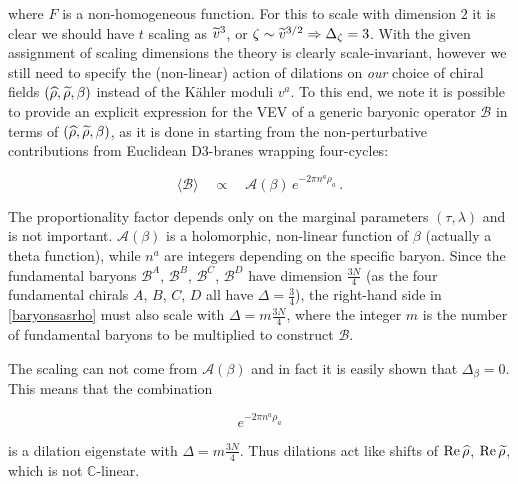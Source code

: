 where $F$ is a non-homogeneous function. For this to scale with dimension $2$ it is clear we should have $t$ scaling as $\widetilde{v}^3$, or $\zeta \sim {\ensuremath{\widetilde{v}}}^{3/2} \Rightarrow \Delta_\zeta = 3$. With the given assignment of scaling dimensions the theory is clearly scale-invariant, however we still need to specify the (non-linear) action of dilations on \emph{our} choice of chiral fields $(\widehat{\rho},\widetilde{\rho},\beta)$ instead of the K\"ahler moduli $v^a$. To this end, we note it is possible to provide an explicit expression for the VEV of a generic baryonic operator $\mathcal{B}$ in terms of $(\widehat{\rho}, \widetilde{\rho}, \beta)$, as it is done in \cite{MZ} starting from the non-perturbative contributions from Euclidean D3-branes wrapping four-cycles:

\begin{equation}
	\langle \mathcal{B} \rangle \quad \propto \quad \mathcal{A}(\beta) \, e^{-2\pi n^a \rho_a}\,.
	\label{baryonsasrho}
\end{equation}

The proportionality factor depends only on the marginal parameters $(\tau,\lambda)$ and is not important. $\mathcal{A}(\beta)$ is a holomorphic, non-linear function of $\beta$ (actually a theta function), while $n^a$ are integers depending on the specific baryon. Since the fundamental baryons $\mathcal{B}^A$, $\mathcal{B}^B$, $\mathcal{B}^C$, $\mathcal{B}^D$ have dimension $\frac{3N}{4}$ (as the four fundamental chirals $A$, $B$, $C$, $D$ all have $\Delta = \frac{3}{4}$), the right-hand side in \eqref{baryonsasrho} must also scale with $\Delta = m\frac{3N}{4}$, where the integer $m$ is the number of fundamental baryons to be multiplied to construct $\mathcal{B}$.

The scaling can not come from $\mathcal{A}(\beta)$ and in fact it is easily shown that $\Delta_\beta = 0$. This means that the combination

\begin{equation}
	e^{-2\pi n^a \rho_a}
	\label{}
\end{equation}

is a dilation eigenstate with $\Delta = m\frac{3N}{4}$. Thus dilations act like shifts of $\operatorname{Re} \widehat{\rho}$, $\operatorname{Re} \widetilde{\rho}$, which is not $\mathbb{C}$-linear.




